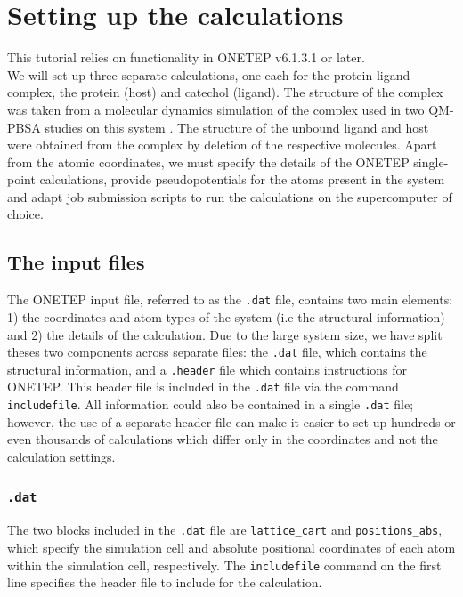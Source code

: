 \documentclass{article}
\begin{document}
\section{Setting up the calculations}

This tutorial relies on functionality in ONETEP v6.1.3.1 or later.\\

We will set up three separate calculations, one each for the protein-ligand complex, the protein (host) and catechol (ligand). The structure of the complex was taken from a molecular dynamics simulation of the complex used in two QM-PBSA studies on this system \cite{Fox2014,Gundelach2021}. The structure of the unbound ligand and host were obtained from the complex by deletion of the respective molecules. Apart from the atomic coordinates, we must specify the details of the ONETEP single-point calculations, provide pseudopotentials for the atoms present in the system and adapt job submission scripts to run the calculations on the supercomputer of choice. 

\subsection{The input files}
The ONETEP input file, referred to as the \verb|.dat| file, contains two main elements: 1) the coordinates and atom types of the system (i.e the structural information) and 2) the details of the calculation. Due to the large system size, we have split theses two components across separate files: the \verb|.dat| file, which contains the structural information, and a \verb|.header| file which contains instructions for ONETEP. This header file is included in the \verb|.dat| file via the command \verb|includefile|. All information could also be contained in a single \verb|.dat| file; however, the use of a separate header file can make it easier to set up hundreds or even thousands of calculations which differ only in the coordinates and not the calculation settings. 

\subsubsection{\texttt{.dat}}
The two blocks included in the \verb|.dat| file are \verb|lattice_cart| and \verb|positions_abs|, which specify the simulation cell and absolute positional coordinates of each atom within the simulation cell, respectively. The \verb|includefile| command on the first line specifies the header file to include for the calculation.
\end{document}
